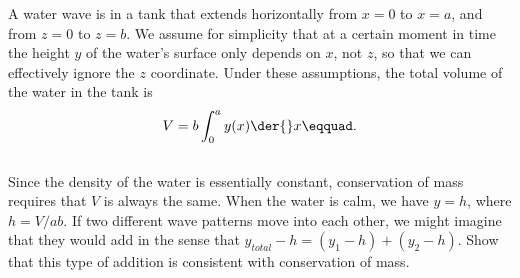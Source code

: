 A water wave is in a tank that extends horizontally from $x=0$ to $x=a$, and
        from $z=0$ to $z=b$. We assume for simplicity that at a certain moment
        in time the height $y$ of the water's
        surface only depends on $x$, not $z$, so that we can effectively ignore the
        $z$ coordinate. Under these assumptions, the total volume of the water in the tank
        is \begin{displaymath}V = b \int_0^a{y(x) \der{}x}\eqquad.\end{displaymath}\\
        Since the density of the water is essentially
        constant, conservation of mass requires that $V$ is always the same. When the
        water is calm, we have $y=h$, where $h=V/ab$. If two different wave patterns move
        into each other, we might imagine that they would add in the sense that $y_{total}-h
        = (y_1-h) + (y_2-h)$. Show that this type of addition is consistent with conservation
        of mass. 
